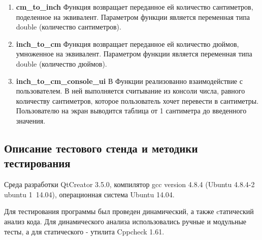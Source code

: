 \documentclass[12pt,a4paper]{report}
\begin{document}
\begin{enumerate}
	\item \textbf{cm\_to\_inch}
	Функция возвращает переданное ей количество сантиметров, поделенное на эквивалент.
	Параметром функции является переменная типа double (количество сантиметров).
	
	\item \textbf{inch\_to\_cm}
	Функция возвращает переданное ей количество дюймов, умноженное на эквивалент.
	Параметром функции является переменная типа double (количество дюймов).	
	
	\item \textbf{inch\_to\_cm\_console\_ui}
	В  Функции реализованно взаимодействие с пользователем. В ней выполняется считывание из консоли числа, равного количеству сантиметров, которое пользователь хочет перевести в сантиметры. Пользователю на экран выводится таблица от 1 сантиметра до введенного значения.	
\end{enumerate}

\subsection{Описание тестового стенда и методики тестирования}
\hspace{\parindent}
Среда разработки QtCreator 3.5.0, компилятор gcc version 4.8.4 (Ubuntu 4.8.4-2 ubuntu 1~14.04), операционная система Ubuntu 14.04. 

Для тестирования программы был проведен динамический, а также cтатический анализ кода. Для динамического анализа использовались ручные и модульные тесты, а для статического - утилита Cppcheck 1.61.
\end{document}
